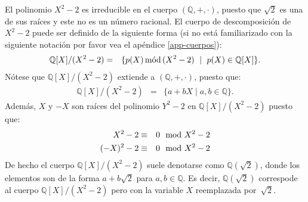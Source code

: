 \begin{example}\label{exa-cuerpo-desc}
El polinomio $X^2-2$ es irreducible en el cuerpo
$(\mathbb{Q},+,\cdot)$, puesto que $\sqrt{2}$ es una de sus raíces y
este no es un número racional. El cuerpo de descomposición de $X^2-2$
puede ser definido de la siguiente forma (si no está familiarizado con
la siguiente notación por favor vea el apéndice \ref{app-cuerpos}):
\begin{eqnarray*}
  \mathbb{Q}[X]/(X^2-2) & = & \{p(X) \mods (X^2-2)  \ \mid \  p(X)\in \mathbb{Q}[X]\}.
\end{eqnarray*}
Nótese que $\mathbb{Q}[X]/(X^2-2)$ extiende a $(\mathbb{Q},+,\cdot)$, puesto que:
\begin{eqnarray*}
  \mathbb{Q}[X]/(X^2-2) & = & \{a+bX  \mid  a,b \in \mathbb{Q}\}.
\end{eqnarray*}
Además, $X$ y $-X$ son raíces del polinomio $Y^2-2$ en $\mathbb{Q}[X]/(X^2-2)$ puesto que:
\begin{eqnarray*}
  X^2 - 2 & \equiv & 0 \modl X^2 - 2\\
  (-X)^2 - 2 & \equiv & 0 \modl X^2 - 2
\end{eqnarray*}
De hecho el cuerpo $\mathbb{Q}[X]/(X^2-2)$ suele denotarse como
$\mathbb{Q}(\sqrt{2})$, donde los elementos son de la forma $a +
b\sqrt{2}$ para $a,b \in \mathbb{Q}$. Es decir, $\mathbb{Q}(\sqrt{2})$
correspode al cuerpo $\mathbb{Q}[X]/(X^2-2)$ pero con la variable $X$
reemplazada por~$\sqrt{2}$.


\end{example}
